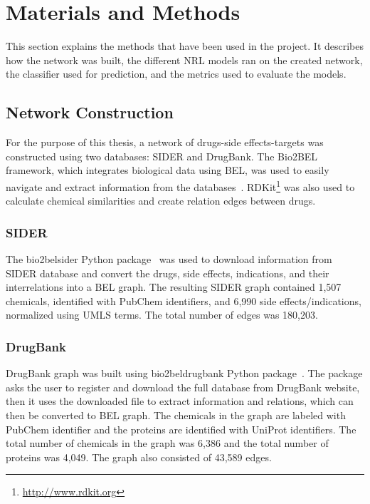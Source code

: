 \chapter{Materials and Methods}
\label{methods}

This section explains the methods that have been used in the project.
It describes how the network was built, the different \ac{NRL} models ran on the created network, the classifier used for prediction, and the metrics used to evaluate the models.

\section{Network Construction}

For the purpose of this thesis, a network of drugs-side effects-targets was constructed using two databases: \ac{SIDER} and DrugBank.
The Bio2BEL framework, which integrates biological data using \ac{BEL}, was used to easily navigate and extract information from the databases~\cite{hoyt_integration_2019}.
RDKit\footnote{\url{http://www.rdkit.org}} was also used to calculate chemical similarities and create relation edges between drugs.

\subsection{SIDER}
The bio2bel\textunderscore sider Python package~\cite{charles_tapley_hoyt_bio2bel/sider_2018} was used to download information from \ac{SIDER} database and convert the drugs, side effects, indications, and their interrelations into a \ac{BEL} graph.
The resulting \ac{SIDER} graph contained 1,507 chemicals, identified with PubChem identifiers, and 6,990 side effects/indications, normalized using \ac{UMLS} terms.
The total number of edges was 180,203.

\subsection{DrugBank}

DrugBank graph was built using bio2bel\textunderscore drugbank Python package~\cite{charles_tapley_hoyt_bio2bel/drugbank_2018}.
The package asks the user to register and download the full database from DrugBank website, then it uses the downloaded file to extract information and relations, which can then be converted to \ac{BEL} graph.
The chemicals in the graph are labeled with PubChem identifier and the proteins are identified with UniProt identifiers.
The total number of chemicals in the graph was 6,386 and the total number of proteins was 4,049.
The graph also consisted of 43,589 edges.


